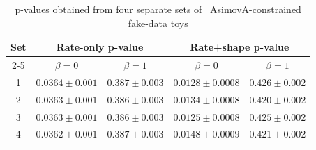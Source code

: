 \begin{table}
\centering
\begin{tabular}{| c | c | c | c | c |}
\hline
\multirow{2}{*}{Set} & \multicolumn{2}{|c|}{Rate-only p-value}  & \multicolumn{2}{|c|}{Rate+shape p-value} \\
\cline{2-5}
   				     & $\beta = 0$          & $\beta = 1$       & $\beta = 0$          & $\beta = 1$       \\
\hline
1                    & $0.0364 \pm 0.001$   & $0.387 \pm 0.003$ & $0.0128 \pm 0.0008$  & $0.426 \pm 0.002$ \\
2                    & $0.0363 \pm 0.001$   & $0.386 \pm 0.003$ & $0.0134 \pm 0.0008$  & $0.420 \pm 0.002$ \\
3                    & $0.0363 \pm 0.001$   & $0.386 \pm 0.003$ & $0.0125 \pm 0.0008$  & $0.425 \pm 0.002$ \\
4                    & $0.0362 \pm 0.001$   & $0.387 \pm 0.003$ & $0.0148 \pm 0.0009$  & $0.421 \pm 0.002$ \\
\hline
\end{tabular}
\caption{
	p-values obtained from four separate sets of \NToysFakeDataRatePlusShape\ AsimovA-{\color{red}constrained} fake-data toys
}
\label{tab:pval_stability}
\end{table}

